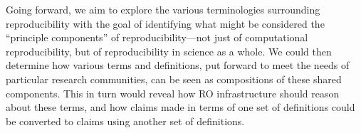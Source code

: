 Going forward, we aim to explore the various terminologies surrounding
    reproducibility with the goal of identifying what might be considered the
    ``principle components'' of reproducibility---not just of computational reproducibility,
    but of reproducibility in science as a whole.
We could then determine how various terms and definitions,
    put forward to meet the needs of particular research communities,
    can be seen as compositions of these shared components.
This in turn would reveal how RO infrastructure should reason about these terms,
	and how claims made in terms of one set of definitions could be converted to
    claims using another set of definitions.

